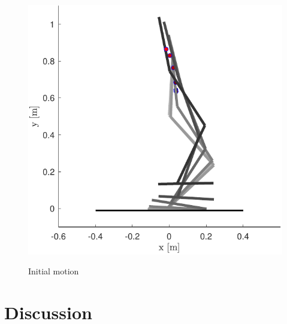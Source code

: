 \documentclass[letterpaper, 10 pt, conference]{ieeeconf}  %
\begin{document}
  \begin{figure}[b]
	\centering
	{\includegraphics[scale=0.5]{initialguess}
	}%
	\caption{Initial motion} \label{fig:seq}	
\end{figure}




\section{Discussion} \label{sec:discussion}
\end{document}
